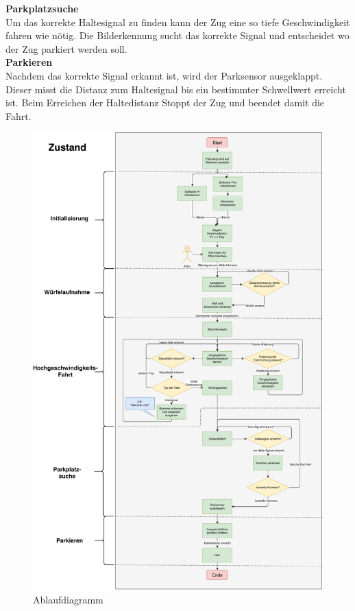 \documentclass[../../main.tex]{subfiles}
\begin{document}
    \textbf{Parkplatzsuche}\\
    Um das korrekte Haltesignal zu finden kann der Zug eine so tiefe Geschwindigkeit fahren wie nötig. Die Bilderkennung sucht das korrekte Signal und entscheidet wo der Zug parkiert werden soll.\\

    \textbf{Parkieren}\\
    Nachdem das korrekte Signal erkannt ist, wird der Parksensor ausgeklappt. Dieser misst die Distanz zum Haltesignal bis ein bestimmter Schwellwert erreicht ist. Beim Erreichen der Haltedistanz Stoppt der Zug und beendet damit die Fahrt.

    \begin{figure}[H]
        \centering
        \includegraphics[width=1.0\textwidth]{Ablaufdiagramm.pdf}
        \caption {Ablaufdiagramm}
        \label{fig:Ablaufdiagramm}
    \end{figure}

    
\end{document}
